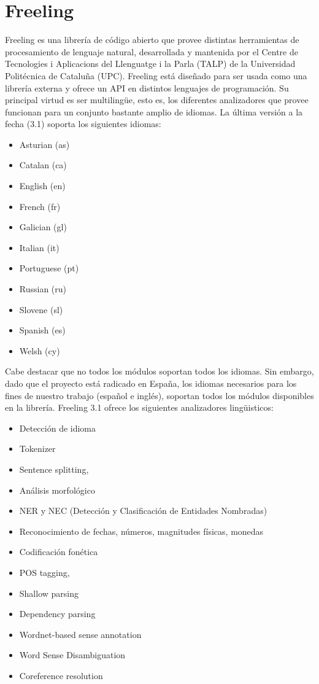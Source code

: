 \section{Freeling}
\label{sec:freeling}
Freeling es una librería de c\'odigo abierto que provee distintas herramientas de 
procesamiento de lenguaje natural, desarrollada y mantenida por el Centre de Tecnologies 
i Aplicacions del Llenguatge i la Parla (TALP) de la Universidad Politécnica de Catalu\~na (UPC). 
Freeling está dise\~nado para ser usada como una librería externa y ofrece un API en distintos lenguajes
de programaci\'on. Su principal virtud es ser multilingüe, esto es, los diferentes analizadores que provee funcionan 
para un conjunto bastante amplio de idiomas. La última versi\'on a la fecha (3.1) soporta los siguientes idiomas:

\begin{itemize}
\item Asturian (as)
\item Catalan (ca) 
\item English (en)
\item French (fr) 
\item Galician (gl)
\item Italian (it)
\item Portuguese (pt)
\item Russian (ru)
\item Slovene (sl)
\item Spanish (es)
\item Welsh (cy)
\end{itemize}

Cabe destacar que no todos los m\'odulos soportan todos los idiomas. Sin embargo, dado que el proyecto está radicado en Espa\~na,
los idiomas necesarios para los fines de nuestro trabajo (espa\~nol e inglés), soportan todos los m\'odulos disponibles
en la librería.
Freeling 3.1 ofrece los siguientes analizadores lingüisticos:

\begin{itemize}
\item Detecci\'on de idioma
\item Tokenizer
\item Sentence splitting,
\item Análisis morfol\'ogico
\item NER y NEC (Detecci\'on y Clasificaci\'on de Entidades Nombradas)
\item Reconocimiento de fechas, números, magnitudes físicas, monedas
\item Codificaci\'on fonética
\item POS tagging, 
\item Shallow parsing
\item Dependency parsing
\item Wordnet-based sense annotation
\item Word Sense Disambiguation
\item Coreference resolution
\end{itemize}



